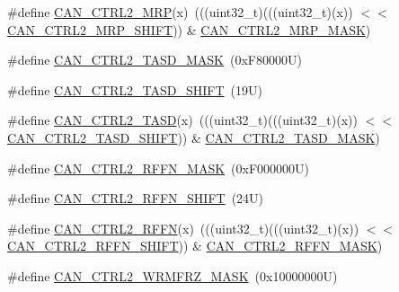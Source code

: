 \begin{DoxyCompactItemize}
\item 
\#define \mbox{\hyperlink{group___c_a_n___register___masks_gadf5c8fb098561087258f675bb458b6db}{C\+A\+N\+\_\+\+C\+T\+R\+L2\+\_\+\+M\+RP}}(x)~(((uint32\+\_\+t)(((uint32\+\_\+t)(x)) $<$$<$ \mbox{\hyperlink{group___c_a_n___register___masks_ga868c342244c921f9824c4d0c172f4081}{C\+A\+N\+\_\+\+C\+T\+R\+L2\+\_\+\+M\+R\+P\+\_\+\+S\+H\+I\+FT}})) \& \mbox{\hyperlink{group___c_a_n___register___masks_ga7f07676c379363d679cfcb6c362e1cc6}{C\+A\+N\+\_\+\+C\+T\+R\+L2\+\_\+\+M\+R\+P\+\_\+\+M\+A\+SK}})
\item 
\#define \mbox{\hyperlink{group___c_a_n___register___masks_ga50bd2b3ca86be2357515614d717e8167}{C\+A\+N\+\_\+\+C\+T\+R\+L2\+\_\+\+T\+A\+S\+D\+\_\+\+M\+A\+SK}}~(0x\+F80000\+U)
\item 
\#define \mbox{\hyperlink{group___c_a_n___register___masks_gac9265ea7ee9b07803fdb62c92aa85ea0}{C\+A\+N\+\_\+\+C\+T\+R\+L2\+\_\+\+T\+A\+S\+D\+\_\+\+S\+H\+I\+FT}}~(19\+U)
\item 
\#define \mbox{\hyperlink{group___c_a_n___register___masks_gaf3ad35b3f0ed4a3a4fea9d9fff938109}{C\+A\+N\+\_\+\+C\+T\+R\+L2\+\_\+\+T\+A\+SD}}(x)~(((uint32\+\_\+t)(((uint32\+\_\+t)(x)) $<$$<$ \mbox{\hyperlink{group___c_a_n___register___masks_gac9265ea7ee9b07803fdb62c92aa85ea0}{C\+A\+N\+\_\+\+C\+T\+R\+L2\+\_\+\+T\+A\+S\+D\+\_\+\+S\+H\+I\+FT}})) \& \mbox{\hyperlink{group___c_a_n___register___masks_ga50bd2b3ca86be2357515614d717e8167}{C\+A\+N\+\_\+\+C\+T\+R\+L2\+\_\+\+T\+A\+S\+D\+\_\+\+M\+A\+SK}})
\item 
\#define \mbox{\hyperlink{group___c_a_n___register___masks_ga2cf8e472f27dccf6b1e9b9af80f76542}{C\+A\+N\+\_\+\+C\+T\+R\+L2\+\_\+\+R\+F\+F\+N\+\_\+\+M\+A\+SK}}~(0x\+F000000\+U)
\item 
\#define \mbox{\hyperlink{group___c_a_n___register___masks_ga573803e007b6904ec3b8c5ab45acf33e}{C\+A\+N\+\_\+\+C\+T\+R\+L2\+\_\+\+R\+F\+F\+N\+\_\+\+S\+H\+I\+FT}}~(24\+U)
\item 
\#define \mbox{\hyperlink{group___c_a_n___register___masks_ga74a275be00e2474d0621b2f09968440c}{C\+A\+N\+\_\+\+C\+T\+R\+L2\+\_\+\+R\+F\+FN}}(x)~(((uint32\+\_\+t)(((uint32\+\_\+t)(x)) $<$$<$ \mbox{\hyperlink{group___c_a_n___register___masks_ga573803e007b6904ec3b8c5ab45acf33e}{C\+A\+N\+\_\+\+C\+T\+R\+L2\+\_\+\+R\+F\+F\+N\+\_\+\+S\+H\+I\+FT}})) \& \mbox{\hyperlink{group___c_a_n___register___masks_ga2cf8e472f27dccf6b1e9b9af80f76542}{C\+A\+N\+\_\+\+C\+T\+R\+L2\+\_\+\+R\+F\+F\+N\+\_\+\+M\+A\+SK}})
\item 
\#define \mbox{\hyperlink{group___c_a_n___register___masks_ga5f73e5da9fb12e711d2b23b7092788f2}{C\+A\+N\+\_\+\+C\+T\+R\+L2\+\_\+\+W\+R\+M\+F\+R\+Z\+\_\+\+M\+A\+SK}}~(0x10000000\+U)
$$
\end{DoxyCompactItemize}
